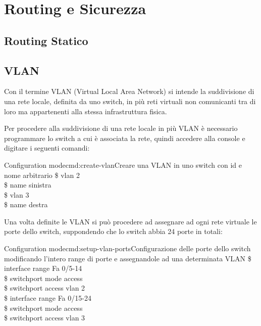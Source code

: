 \section{Routing e Sicurezza}
\subsection{Routing Statico}
\subsection{VLAN}
Con il termine VLAN (Virtual Local Area Network) si intende la suddivisione di una rete locale, definita da uno switch, in più reti virtuali non comunicanti tra di loro ma appartenenti alla stessa infrastruttura fisica.

Per procedere alla suddivisione di una rete locale in più VLAN è necessario programmare lo switch a cui è associata la rete, quindi accedere alla console e digitare i seguenti comandi:

\begin{cmds}[Switch]{Configuration mode}{cmd:create-vlan}{Creare una VLAN in uno switch con \textcolor{Highlight1}{id} e \textcolor{Highlight2}{nome} arbitrario}
    \$ vlan \textcolor{Highlight1}{2}\\
    \$ name \textcolor{Highlight2}{sinistra}\\
    \$ vlan \textcolor{Highlight1}{3}\\
    \$ name \textcolor{Highlight2}{destra}
\end{cmds}

Una volta definite le VLAN si può procedere ad assegnare ad ogni rete virtuale le porte dello switch, suppondendo che lo switch abbia 24 porte in totali:

\begin{cmds}{Configuration mode}{cmd:setup-vlan-ports}{Configurazione delle porte dello switch modificando l'intero \textcolor{Highlight1}{range} di porte e assegnandole ad una \textcolor{Highlight2}{determinata VLAN}}
    \$ interface range \textcolor{Highlight1}{Fa 0/5-14}\\
    \$ switchport mode access\\
    \$ switchport access \textcolor{Highlight2}{vlan 2}\\
    \$ interface range \textcolor{Highlight1}{Fa 0/15-24}\\
    \$ switchport mode access\\
    \$ switchport access \textcolor{Highlight2}{vlan 3}
\end{cmds}

